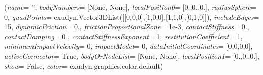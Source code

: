 %
\begin{flushleft}
\label{sec:mainsystemextensions:CreateSphereQuadContact}
({\it name}= '', {\it bodyNumbers}= [None, None], {\it localPosition0}= [0.,0.,0.], {\it radiusSphere}= 0, {\it quadPoints}= exudyn.Vector3DList([[0,0,0],[1,0,0],[1,1,0],[0,1,0]]), {\it includeEdges}= 15, {\it dynamicFriction}= 0., {\it frictionProportionalZone}= 1e-3, {\it contactStiffness}= 0., {\it contactDamping}= 0., {\it contactStiffnessExponent}= 1, {\it restitutionCoefficient}= 1, {\it minimumImpactVelocity}= 0, {\it impactModel}= 0, {\it dataInitialCoordinates}= [0,0,0,0], {\it activeConnector}= True, {\it bodyOrNodeList}= [None, None], {\it localPosition1}= [0.,0.,0.], {\it show}= False, {\it color}= exudyn.graphics.color.default)
\end{flushleft}
\setlength{\itemindent}{0.7cm}
